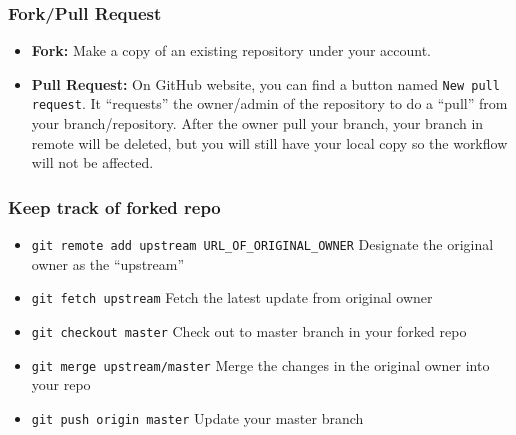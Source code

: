 \documentclass{beamer}
\begin{document}
			\begin{frame}
				\frametitle{Fork/Pull Request}
				\begin{itemize}
					\item \textbf{Fork:} Make a copy of an existing repository under your account. 
					\item \textbf{Pull Request: }On GitHub website, you can find a button named \texttt{New pull request}. It ``requests'' the owner/admin of the repository to do a ``pull'' from your branch/repository. After the owner pull your branch, your branch in remote will be deleted, but you will still have your local copy so the workflow will not be affected.
				\end{itemize}				
			\end{frame}

			\begin{frame}
				\frametitle{Keep track of forked repo}
				\begin{itemize}
					\item \texttt{git remote add upstream URL\_OF\_ORIGINAL\_OWNER} Designate the original owner as the ``upstream''
					\item \texttt{git fetch upstream} Fetch the latest update from original owner
					\item \texttt{git checkout master} Check out to master branch in your forked repo
					\item \texttt{git merge upstream/master} Merge the changes in the original owner into your repo
					\item \texttt{git push origin master} Update your master branch
				\end{itemize}					
			\end{frame}
	\frame{\titlepage}
\end{document}
